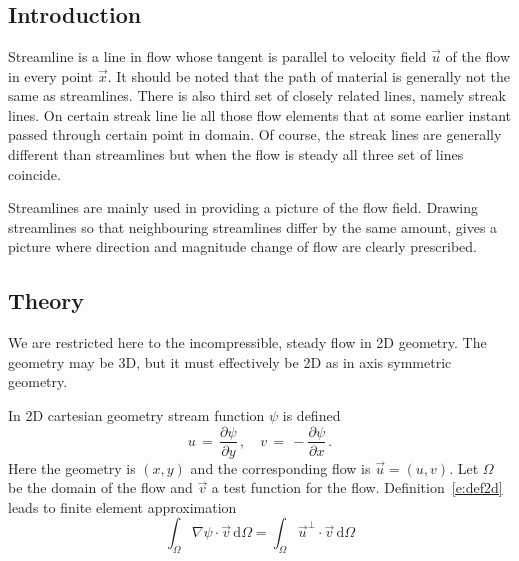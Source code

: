 \chapter{}
\noindent
{}
\begin{versiona}

\section{Introduction}

Streamline is a line in flow whose tangent is parallel to velocity field
$\vec u$ of the flow in every point $\vec x$. It should be noted that the path of 
material is generally not the same as streamlines. There is also third set
of closely related lines, namely streak lines. On certain streak line
lie all those flow elements that at some earlier instant passed through
certain point in domain. Of course, the streak lines are generally different
than streamlines but when the flow is steady all three set of lines coincide.

Streamlines are mainly used in providing a picture of the flow field. 
Drawing streamlines so that neighbouring streamlines differ by the same amount, 
gives a picture where direction and magnitude change of flow are clearly prescribed.

\section{Theory}

We are restricted here to the incompressible, steady flow in 2D geometry.
The geometry may be 3D, but it must effectively be 2D as in axis symmetric
geometry.

In 2D cartesian geometry stream function $\psi$ is defined
\begin{equation}\label{e:def2d}
u \, = \, \frac{\partial \psi}{\partial y} \, , \quad
v \, = \, - \frac{\partial \psi}{\partial x} \,.
\end{equation}
Here the geometry is $(x,y)$ and the corresponding flow is $\vec u = (u,v)$.
Let $\Omega$ be the domain of the flow and $\vec v$ a test function for the flow.
Definition~\eqref{e:def2d} leads to finite element approximation
\begin{equation}\label{e:fem2D}
\int_\Omega \nabla \psi \cdot \vec v \, \text{d}\Omega
=
\int_\Omega \vec u^\perp \cdot \vec v \, \text{d}\Omega
\end{equation}


\end{versiona}
